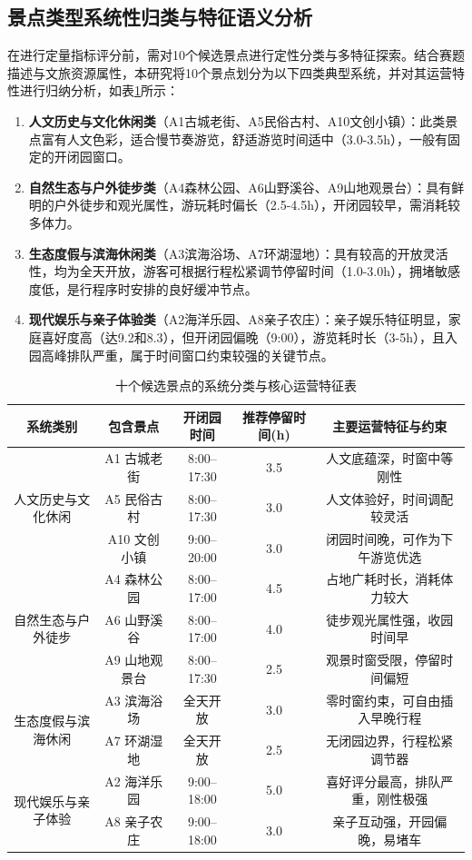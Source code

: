 \documentclass{cumcmthesis}
\begin{document}
\subsection{景点类型系统性归类与特征语义分析}
在进行定量指标评分前，需对10个候选景点进行定性分类与多特征探索。结合赛题描述与文旅资源属性，本研究将10个景点划分为以下四类典型系统，并对其运营特性进行归纳分析，如表\ref{tab:spot_classification}所示：
\begin{enumerate}
\item \textbf{人文历史与文化休闲类}（A1古城老街、A5民俗古村、A10文创小镇）：此类景点富有人文色彩，适合慢节奏游览，舒适游览时间适中（3.0-3.5h），一般有固定的开闭园窗口。
\item \textbf{自然生态与户外徒步类}（A4森林公园、A6山野溪谷、A9山地观景台）：具有鲜明的户外徒步和观光属性，游玩耗时偏长（2.5-4.5h），开闭园较早，需消耗较多体力。
\item \textbf{生态度假与滨海休闲类}（A3滨海浴场、A7环湖湿地）：具有较高的开放灵活性，均为全天开放，游客可根据行程松紧调节停留时间（1.0-3.0h），拥堵敏感度低，是行程序时安排的良好缓冲节点。
\item \textbf{现代娱乐与亲子体验类}（A2海洋乐园、A8亲子农庄）：亲子娱乐特征明显，家庭喜好度高（达9.2和8.3），但开闭园偏晚（9:00），游览耗时长（3-5h），且入园高峰排队严重，属于时间窗口约束较强的关键节点。
\end{enumerate}
\begin{table}[htbp]
\centering
\caption{十个候选景点的系统分类与核心运营特征表}
\label{tab:spot_classification}
\small
\begin{tabular}{ccccc}
\toprule
系统类别 & 包含景点 & 开闭园时间 & 推荐停留时间(h) & 主要运营特征与约束 \\
\midrule
\multirow{3}{*}{人文历史与文化休闲} & A1 古城老街 & 8:00--17:30 & 3.5 & 人文底蕴深，时窗中等刚性 \\
& A5 民俗古村 & 8:00--17:30 & 3.0 & 人文体验好，时间调配较灵活 \\
& A10 文创小镇 & 9:00--20:00 & 3.0 & 闭园时间晚，可作为下午游览优选 \\
\midrule
\multirow{3}{*}{自然生态与户外徒步} & A4 森林公园 & 8:00--17:00 & 4.5 & 占地广耗时长，消耗体力较大 \\
& A6 山野溪谷 & 8:00--17:00 & 4.0 & 徒步观光属性强，收园时间早 \\
& A9 山地观景台 & 8:00--17:30 & 2.5 & 观景时窗受限，停留时间偏短 \\
\midrule
\multirow{2}{*}{生态度假与滨海休闲} & A3 滨海浴场 & 全天开放 & 3.0 & 零时窗约束，可自由插入早晚行程 \\
& A7 环湖湿地 & 全天开放 & 2.5 & 无闭园边界，行程松紧调节器 \\
\midrule
\multirow{2}{*}{现代娱乐与亲子体验} & A2 海洋乐园 & 9:00--18:00 & 5.0 & 喜好评分最高，排队严重，刚性极强 \\
& A8 亲子农庄 & 9:00--18:00 & 3.0 & 亲子互动强，开园偏晚，易堵车 \\
\bottomrule
\end{tabular}
\end{table}
\end{document}
